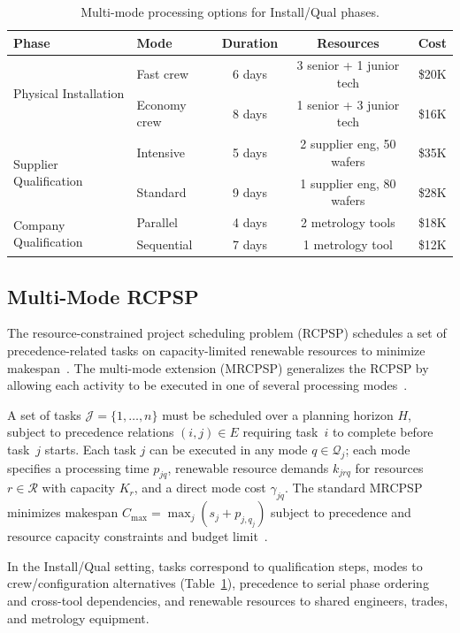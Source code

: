 \documentclass[11pt]{article}
\newcommand{\calJ}{\mathcal{J}}
\newcommand{\calR}{\mathcal{R}}
\newcommand{\calQ}{\mathcal{Q}}
\begin{document}
\begin{table}[H]
\centering
\caption{Multi-mode processing options for Install/Qual phases.}
\label{tab:multimode}
\small
\begin{tabular}{@{}llccc@{}}
\toprule
\textbf{Phase} & \textbf{Mode} & \textbf{Duration} & \textbf{Resources} & \textbf{Cost} \\
\midrule
\multirow{2}{*}{Physical Installation}
  & Fast crew   & 6 days & 3 senior + 1 junior tech & \$20K \\
  & Economy crew & 8 days & 1 senior + 3 junior tech & \$16K \\
\midrule
\multirow{2}{*}{Supplier Qualification}
  & Intensive  & 5 days & 2 supplier eng, 50 wafers & \$35K \\
  & Standard   & 9 days & 1 supplier eng, 80 wafers & \$28K \\
\midrule
\multirow{2}{*}{Company Qualification}
  & Parallel   & 4 days & 2 metrology tools & \$18K \\
  & Sequential & 7 days & 1 metrology tool  & \$12K \\
\bottomrule
\end{tabular}
\end{table}

\subsection{Multi-Mode RCPSP}

The resource-constrained project scheduling problem (RCPSP) schedules a set of precedence-related tasks on capacity-limited renewable resources to minimize makespan~\citep{herroelen1998rcpsp}.
The multi-mode extension (MRCPSP) generalizes the RCPSP by allowing each activity to be executed in one of several processing modes~\citep{hartmann2010survey,cheng2015splitting}.

A set of tasks $\calJ = \{1, \dots, n\}$ must be scheduled over a planning horizon $H$, subject to precedence relations $(i, j) \in E$ requiring task~$i$ to complete before task~$j$ starts.
Each task $j$ can be executed in any mode $q \in \calQ_j$; each mode specifies a processing time $p_{jq}$, renewable resource demands $k_{jrq}$ for resources $r \in \calR$ with capacity $K_r$, and a direct mode cost $\gamma_{jq}$.
The standard MRCPSP minimizes makespan $C_{\max} = \max_j (s_j + p_{j,q_j})$ subject to precedence and resource capacity constraints and budget limit~\citep{ieee2013semircpsp}.

In the Install/Qual setting, tasks correspond to qualification steps, modes to crew/configuration alternatives (Table~\ref{tab:multimode}), precedence to serial phase ordering and cross-tool dependencies, and renewable resources to shared engineers, trades, and metrology equipment.
\end{document}

